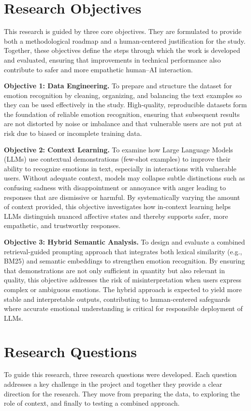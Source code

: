 \section{Research Objectives}
This research is guided by three core objectives. They are formulated to provide both a methodological roadmap and a human-centered justification for the study. Together, these objectives define the steps through which the work is developed and evaluated, ensuring that improvements in technical performance also contribute to safer and more empathetic human–AI interaction.  

\textbf{Objective 1: Data Engineering.}  
To prepare and structure the dataset for emotion recognition by cleaning, organizing, and balancing the text examples so they can be used effectively in the study. High-quality, reproducible datasets form the foundation of reliable emotion recognition, ensuring that subsequent results are not distorted by noise or imbalance and that vulnerable users are not put at risk due to biased or incomplete training data.  

\textbf{Objective 2: Context Learning.}  
To examine how Large Language Models (LLMs) use contextual demonstrations (few-shot examples) to improve their ability to recognize emotions in text, especially in interactions with vulnerable users. Without adequate context, models may collapse subtle distinctions such as confusing sadness with disappointment or annoyance with anger leading to responses that are dismissive or harmful. By systematically varying the amount of context provided, this objective investigates how in-context learning helps LLMs distinguish nuanced affective states and thereby supports safer, more empathetic, and trustworthy responses.  

\textbf{Objective 3: Hybrid Semantic Analysis.}  
To design and evaluate a combined retrieval-guided prompting approach that integrates both lexical similarity (e.g., BM25) and semantic embeddings to strengthen emotion recognition. By ensuring that demonstrations are not only sufficient in quantity but also relevant in quality, this objective addresses the risk of misinterpretation when users express complex or ambiguous emotions. The hybrid approach is expected to yield more stable and interpretable outputs, contributing to human-centered safeguards where accurate emotional understanding is critical for responsible deployment of LLMs.  
\section{Research Questions}
To guide this research, three research questions were developed. Each question addresses a key challenge in the project and together they provide a clear direction for the research. They move from preparing the data, to exploring the role of context, and finally to testing a combined approach.

